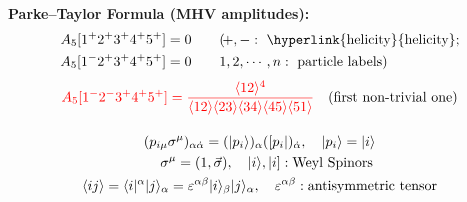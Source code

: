 \documentclass{beamer}
\newcommand{\aket}[1]{|#1\rangle}
\newcommand{\sket}[1]{|#1]}
\newcommand{\avg}[1]{\langle #1 \rangle}
\begin{document}
\begin{frame}
    \qquad \textbf{Parke–Taylor Formula (MHV amplitudes):}
    \begin{align*}
    A_5[1^+2^+3^+4^+5^+] &= 0 
    \qquad (\!+,-:~\text{\hyperlink{helicity}{helicity};} \\
    A_5[1^-2^+3^+4^+5^+] &= 0 
    \qquad 1,2,\cdots,n:~\text{particle labels}) \\
    \end{align*}
    \pause
    \vspace{-3em}
    \hypertarget{conv}{}
    \begin{gather*}
    \textcolor{red}{A_5[1^-2^-3^+4^+5^+]= 
    \frac{\langle 1 2 \rangle^4}
         {\langle 1 2 \rangle \langle 2 3 \rangle \langle 3 4 \rangle \langle45 \rangle \langle 5 1 \rangle}}\quad (\text{first non-trivial one})\\[1em]
    (p_{i\mu} \sigma^\mu)_{\alpha\dot{\alpha}}=(\aket{p_i})_\alpha([p_i|)_{\dot{\alpha}},\quad \aket{p_i}=\aket{i}\\
    \quad \sigma^\mu=(1,\vec{\sigma}),\quad \aket{i},\sket{i}: \text{Weyl Spinors}\\
    \avg{ij}=\langle i |^\alpha \aket{j}_\alpha=\varepsilon^{\alpha\beta}\aket{i}_\beta\aket{j}_\alpha,\quad \varepsilon^{\alpha\beta}: \text{antisymmetric tensor}
    \end{gather*}
\end{frame}
\end{document}
